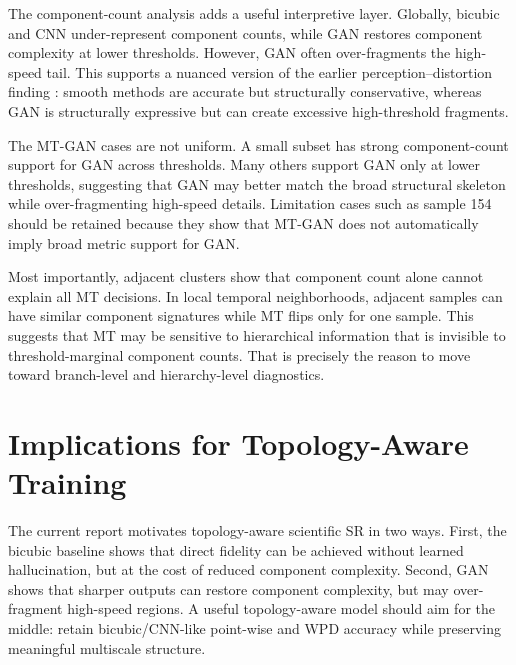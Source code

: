 \documentclass[conference]{IEEEtran}
\begin{document}
The component-count analysis adds a useful interpretive layer. Globally, bicubic and CNN under-represent component counts, while GAN restores component complexity at lower thresholds. However, GAN often over-fragments the high-speed tail. This supports a nuanced version of the earlier perception--distortion finding \cite{BlauMichaeli_2018}: smooth methods are accurate but structurally conservative, whereas GAN is structurally expressive but can create excessive high-threshold fragments.

The MT-GAN cases are not uniform. A small subset has strong component-count support for GAN across thresholds. Many others support GAN only at lower thresholds, suggesting that GAN may better match the broad structural skeleton while over-fragmenting high-speed details. Limitation cases such as sample 154 should be retained because they show that MT-GAN does not automatically imply broad metric support for GAN.

Most importantly, adjacent clusters show that component count alone cannot explain all MT decisions. In local temporal neighborhoods, adjacent samples can have similar component signatures while MT flips only for one sample. This suggests that MT may be sensitive to hierarchical information that is invisible to threshold-marginal component counts. That is precisely the reason to move toward branch-level and hierarchy-level diagnostics.

\section{Implications for Topology-Aware Training}

The current report motivates topology-aware scientific SR in two ways. First, the bicubic baseline shows that direct fidelity can be achieved without learned hallucination, but at the cost of reduced component complexity. Second, GAN shows that sharper outputs can restore component complexity, but may over-fragment high-speed regions. A useful topology-aware model should aim for the middle: retain bicubic/CNN-like point-wise and WPD accuracy while preserving meaningful multiscale structure.
\end{document}

